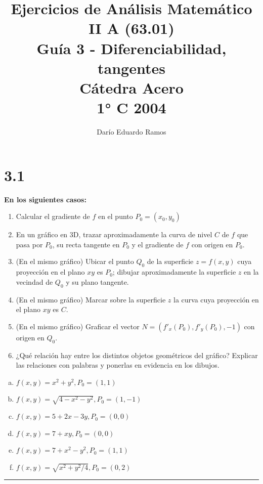 \documentclass{article}
\title{Ejercicios de Análisis Matemático II A (63.01) \\
Guía 3 - Diferenciabilidad, tangentes \\
Cátedra Acero \\
1° C 2004}
\author{Darío Eduardo Ramos}
\begin{document}
\maketitle

\tableofcontents{}
\newpage

\section*{3.1}
\label{sec:3.1}

\textbf{En los siguientes casos:} 

\begin{enumerate}
\bfseries

\item Calcular el gradiente de $f$ en el punto $P_0 = (x_0, y_0)$
\item En un gráfico en 3D, trazar aproximadamente la curva de nivel $C$ de $f$ que pasa por $P_0$, su recta tangente en $P_0$ y el gradiente de $f$ con origen en $P_0$.
\item (En el mismo gráfico) Ubicar el punto $Q_0$ de la superficie $z = f(x,y)$ cuya proyección en el plano $xy$ es $P_0$; dibujar aproximadamente la superficie $z$ en la vecindad de $Q_0$ y su plano tangente.
\item (En el mismo gráfico) Marcar sobre la superficie $z$ la curva cuya proyección en el plano $xy$ es $C$.
\item (En el mismo gráfico) Graficar el vector $N = (f'_x(P_0), f'_y(P_0), -1)$ con origen en $Q_0$.
\item ¿Qué relación hay entre los distintos objetos geométricos del gráfico? Explicar las relaciones con palabras y ponerlas en evidencia en los dibujos.

\end{enumerate}

\begin{enumerate}[(a)]
\bfseries

\item $f(x,y)=x^2+y^2, P_0 = (1,1)$
\item $f(x,y)=\sqrt{4-x^2-y^2}, P_0 = (1,-1)$
\item $f(x,y)=5+2x-3y, P_0=(0,0)$
\item $f(x,y)=7+xy, P_0=(0,0)$
\item $f(x,y)=7+x^2-y^2, P_0=(1,1)$
\item $f(x,y)=\sqrt{x^2+y^2/4}, P_0=(0,2)$

\end{enumerate}
\hrule
\end{document}
